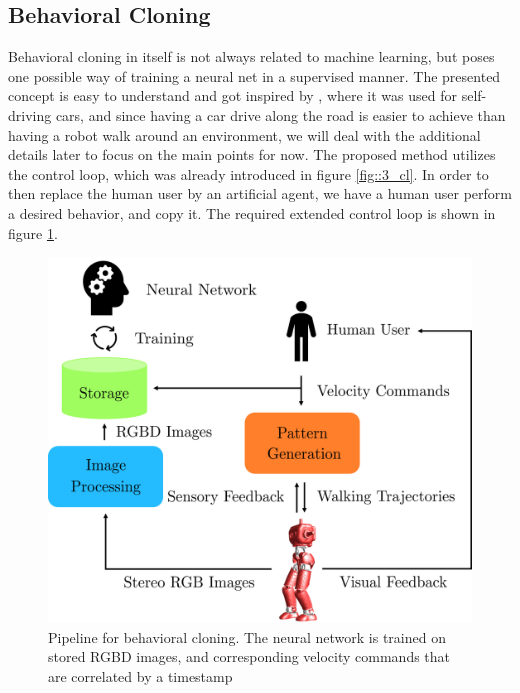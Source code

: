 \subsection{Behavioral Cloning}
\label{sec::322_bc}
Behavioral cloning in itself is not always related to machine learning, but poses one possible way of training a neural net in a supervised manner. The presented concept is easy to understand and got inspired by \cite{bojarski2016end}, where it was used for self-driving cars, and since having a car drive along the road is easier to achieve than having a robot walk around an environment, we will deal with the additional details later to focus on the main points for now. The proposed method utilizes the control loop, which was already introduced in figure \ref{fig::3_cl}. In order to then replace the human user by an artificial agent, we have a human user perform a desired behavior, and copy it. The required extended control loop is shown in figure \ref{fig::322_bc}.
\begin{figure}[h]
	\centering
	\includegraphics[scale=.5]{chapters/03_background/img/behavioral_cloning.png}
	\caption{Pipeline for behavioral cloning. The neural network is trained on stored RGBD images, and corresponding velocity commands that are correlated by a timestamp}
	\label{fig::322_bc}
\end{figure}

